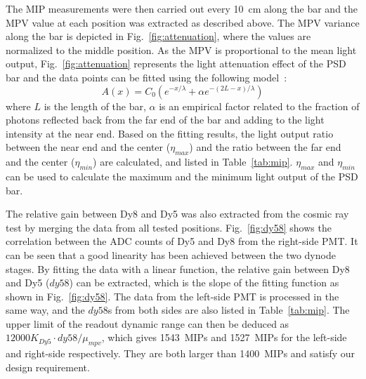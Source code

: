 \documentclass[preprint, times]{elsarticle}
\begin{document}
The MIP measurements were then carried out every \SI{10}{\centi\meter} along the bar and the MPV value at each position was extracted as described above.
The MPV variance along the bar is depicted in Fig.~\ref{fig:attenuation}, where the values are normalized to the middle position.
As the MPV is proportional to the mean light output, Fig.~\ref{fig:attenuation} represents the light attenuation effect of the PSD bar and the data points can be fitted using the following model~\cite{taiuti_measurement_1996}:
\begin{equation}
A(x)=C_0(e^{-x/\lambda} + \alpha e^{-(2L-x)/\lambda})
\end{equation}
where $L$ is the length of the bar, $\alpha$ is an empirical factor related to the fraction of photons reflected back from the far end of the bar and adding to the light intensity at the near end.
Based on the fitting results, the light output ratio between the near end and the center ($\eta_{max}$) and the ratio between the far end and the center ($\eta_{min}$) are calculated,  and listed in Table~\ref{tab:mip}.
$\eta_{max}$ and $\eta_{min}$ can be used to calculate the maximum and the minimum light output of the PSD bar.

The relative gain between Dy8 and Dy5 was also extracted from the cosmic ray test by merging the data from all tested positions.
Fig.~\ref{fig:dy58} shows the correlation between the ADC counts of Dy5 and Dy8 from the right-side PMT.
It can be seen that a good linearity has been achieved between the two dynode stages.
By fitting the data with a linear function, the relative gain between Dy8 and Dy5 ($dy58$) can be extracted, which is the slope of the fitting function as shown in Fig.~\ref{fig:dy58}.
The data from the left-side PMT is processed in the same way, and the $dy58$s from both sides are also listed in Table~\ref{tab:mip}.
The upper limit of the readout dynamic range can then be deduced as $12000K_{Dy5} \cdot dy58/\mu_{mpv}$, which gives \SI{1543}{MIPs} and \SI{1527}{MIPs} for the left-side and right-side respectively.
They are both larger than \SI{1400}{MIPs} and satisfy our design requirement.
\end{document}
